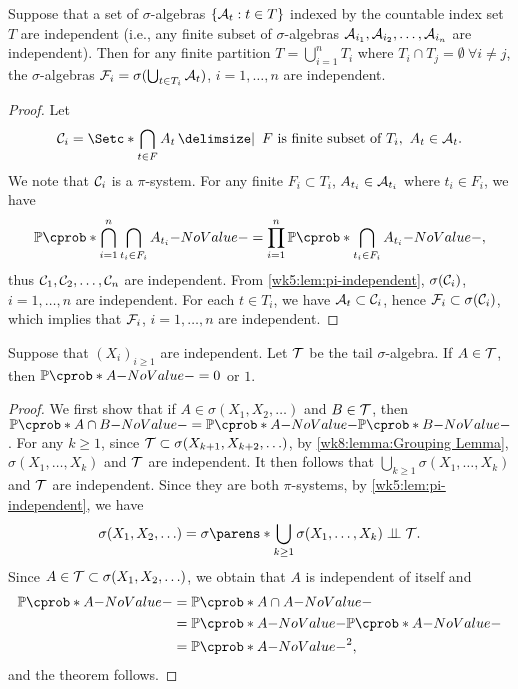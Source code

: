\documentclass[12pt]{article}
\begin{document}
\begin{Lemma}\label{wk8:lemma:Grouping Lemma}
Suppose that a set of $\sigma$-algebras $\{\mathcal{A}_t: t\in T\}$ indexed by the countable index set $T$ are independent (i.e., any finite subset of $\sigma$-algebras $\mathcal{A}_{i_1},\mathcal{A}_{i_2},\ldots,\mathcal{A}_{i_n}$ are independent). Then for any finite partition $T= \bigcup_{i=1}^{n} T_i$ where $T_i \cap T_j = \emptyset \ \forall i\neq j$, the $\sigma$-algebras $\mathcal{F}_i=\sigma(\bigcup_{t\in T_i}\mathcal{A}_t)$, $i=1,\ldots,n$ are independent. 
\end{Lemma}
\begin{proof}
Let 
\begin{align*}
\calC_i =\set*{\bigcap_{t \in F} A_t\given \text{ $F$ is finite subset of } T_i,\ A_t \in \calA_t}.
\end{align*}
We note that $\mathcal{C}_i $ is a $\pi$-system. For any finite $F_i \subset T_i$, $A_{t_i} \in \mathcal{A}_{t_i}$ where $t_i\in F_i$, we have
\begin{align*}
\P (\bigcap_{i=1}^n \bigcap_{t_i\in F_i} A_{t_i})= \prod_{i=1}^n \P(\bigcap_{t_i\in F_i} A_{t_i}),
\end{align*}
thus $\mathcal{C}_1,\mathcal{C}_2,\ldots ,\mathcal{C}_n$ are independent. From \cref{wk5:lem:pi-independent}, $\sigma(\mathcal{C}_i)$, $i=1,\ldots,n$ are independent. For each $t \in T_i$, we have $\mathcal{A}_t \subset \mathcal{C}_i$, hence $\mathcal{F}_i \subset \sigma(\mathcal{C}_i)$, which implies that $\mathcal{F}_i$, $i=1,\ldots,n$ are independent.
\end{proof}

\begin{Theorem} 
Suppose that $(X_i)_{i\geq1}$ are independent. Let $\mathcal{T}$ be the tail $\sigma$-algebra. If $A \in\mathcal{T}$, then $\P(A)=0$ or $1$.
\end{Theorem}
\begin{proof}
We first show that if $A \in \sigma(X_1,X_2,\ldots)$ and  $B\in\mathcal{T}$, then $\P(A\cap B) = \P(A) \P(B)$.
For any $k\geq1$, since $\mathcal{T} \subset \sigma(X_{k+1},X_{k+2},\ldots)$, by \cref{wk8:lemma:Grouping Lemma}, $\sigma(X_1,\ldots,X_k)$ and $\mathcal{T}$ are independent. It then follows that $\bigcup_{k\geq1}\sigma(X_1,\ldots,X_k)$ and $\mathcal{T}$ are independent. Since they are both $\pi$-systems, by \cref{wk5:lem:pi-independent}, we have 
\begin{align*}
\sigma(X_1,X_2,\ldots)=\sigma\parens*{\bigcup_{k\geq1}\sigma(X_1,\ldots,X_k)} \independent \calT. 
\end{align*}
Since $A\in \mathcal{T} \subset \sigma(X_1,X_2,\ldots)$, we obtain that $A$ is independent of itself and
\begin{align*}
\P(A)&=\P(A\cap A)\\
&=\P (A)\P (A)\\
&=\P (A) ^2,
\end{align*}
and the theorem follows.
\end{proof}
\end{document}
